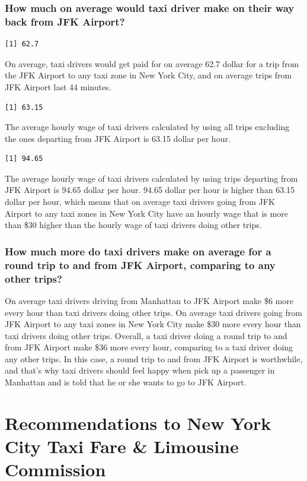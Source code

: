 \documentclass[12pt,twoside]{reedthesis}
\theoremstyle{definition}
\theoremstyle{definition}
\theoremstyle{definition}
\theoremstyle{remark}
\begin{document}
\subsubsection{How much on average would taxi driver make on their way
back from JFK
Airport?}\label{how-much-on-average-would-taxi-driver-make-on-their-way-back-from-jfk-airport-1}
\begin{verbatim}
[1] 62.7
\end{verbatim}
On average, taxi drivers would get paid for on average 62.7 dollar for a
trip from the JFK Airport to any taxi zone in New York City, and on
average trips from JFK Airport last 44 minutes.
\begin{verbatim}
[1] 63.15
\end{verbatim}
The average hourly wage of taxi drivers calculated by using all trips
excluding the ones departing from JFK Airport is 63.15 dollar per hour.
\begin{verbatim}
[1] 94.65
\end{verbatim}
The average hourly wage of taxi drivers calculated by using trips
departing from JFK Airport is 94.65 dollar per hour. 94.65 dollar per
hour is higher than 63.15 dollar per hour, which means that on average
taxi drivers going from JFK Airport to any taxi zones in New York City
have an hourly wage that is more than \$30 higher than the hourly wage
of taxi drivers doing other trips.

\subsubsection{How much more do taxi drivers make on average for a round
trip to and from JFK Airport, comparing to any other
trips?}\label{how-much-more-do-taxi-drivers-make-on-average-for-a-round-trip-to-and-from-jfk-airport-comparing-to-any-other-trips}

On average taxi drivers driving from Manhattan to JFK Airport make \$6
more every hour than taxi drivers doing other trips. On average taxi
drivers going from JFK Airport to any taxi zones in New York City make
\$30 more every hour than taxi drivers doing other trips. Overall, a
taxi driver doing a round trip to and from JFK Airport make \$36 more
every hour, comparing to a taxi driver doing any other trips. In this
case, a round trip to and from JFK Airport is worthwhile, and that's why
taxi drivers should feel happy when pick up a passenger in Manhattan and
is told that he or she wants to go to JFK Airport.

\section{Recommendations to New York City Taxi Fare \& Limousine
Commission}\label{recommendations-to-new-york-city-taxi-fare-limousine-commission}
\end{document}
